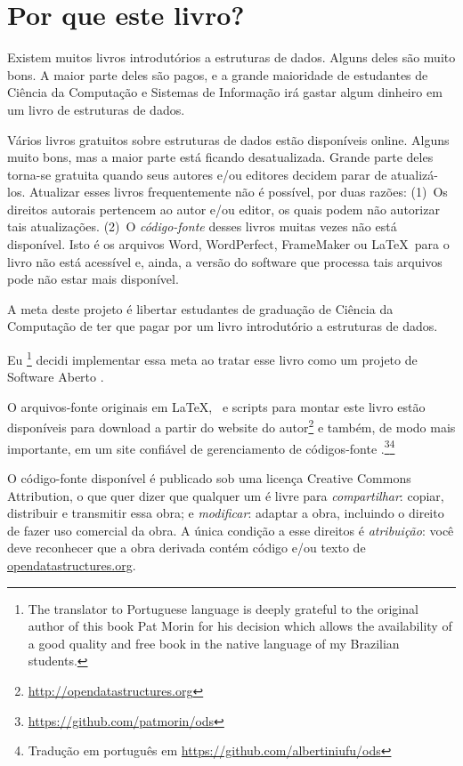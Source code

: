 \chapter*{Por que este livro?}

Existem muitos livros introdutórios a estruturas de dados.
Alguns deles são muito bons. A maior parte deles são pagos, e a 
grande maioridade de estudantes de Ciência da Computação e Sistemas de 
Informação irá gastar algum dinheiro em um livro de estruturas de dados.

Vários livros gratuitos sobre estruturas de dados estão disponíveis online.
Alguns muito bons, mas a maior parte está ficando desatualizada. Grande
parte deles torna-se gratuita quando seus autores e/ou editores decidem
parar de atualizá-los. Atualizar esses livros frequentemente não é possível,
por duas razões: (1)~Os direitos autorais pertencem ao autor e/ou editor,
os quais podem não autorizar tais atualizações. (2)~O \emph{código-fonte} desses
livros muitas vezes não está disponível. Isto é os arquivos Word, WordPerfect, 
FrameMaker ou \LaTeX\ para o livro não está acessível e, ainda, a versão do
software que processa tais arquivos pode não estar mais disponível.

A meta deste projeto é libertar estudantes de graduação de Ciência da Computação
de ter que pagar por um livro introdutório a estruturas de dados.

Eu
\footnote{The translator to Portuguese language is deeply grateful to the original author of this book Pat Morin for his decision which allows the availability of a good quality and free book in the
native language of my Brazilian students.} decidi implementar essa meta ao tratar esse livro como um projeto de Software Aberto
%
%
.

O arquivos-fonte originais em \LaTeX, \lang\ e scripts para montar este livro estão disponíveis para download a partir do website do autor\footnote{\url{http://opendatastructures.org}}
e também, de modo mais importante, em um site confiável de gerenciamento de códigos-fonte
.\footnote{\url{https://github.com/patmorin/ods}}\footnote{Tradução em português em \url{https://github.com/albertiniufu/ods}}

O código-fonte disponível é publicado sob uma licença 
Creative Commons Attribution,
o que quer dizer que qualquer um é livre para \emph{compartilhar}:
copiar, distribuir e
transmitir essa obra; e \emph{modificar}:
adaptar a obra, incluindo o direito
de fazer uso comercial da obra.
A única condição a esse direitos é \emph{atribuição}:
você deve reconhecer que a obra derivada contém código e/ou texto de \url{opendatastructures.org}.

